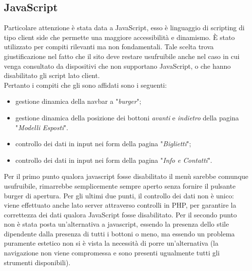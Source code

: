 \subsection{JavaScript}
Particolare attenzione è stata data a JavaScript, esso è linguaggio di scripting di tipo client side che permette una	maggiore accessibilità e dinamismo. È stato utilizzato per compiti rilevanti ma non fondamentali. Tale scelta trova giustificazione nel fatto che il sito deve restare usufruibile anche nel caso in cui venga consultato da dispositivi che non supportano JavaScript, o che hanno disabilitato gli script lato client.\\
Pertanto i compiti che gli sono affidati sono i seguenti:
\begin{itemize}
	\item gestione dinamica della navbar a "\textit{burger}";
	\item gestione dinamica della posizione dei bottoni \textit{avanti} e \textit{indietro} della pagina "\textit{Modelli Esposti}".
	\item controllo dei dati in input nei form della pagina "\textit{Biglietti}";
	\item controllo dei dati in input nei form della pagina "\textit{Info e Contatti}".
\end{itemize}
Per il primo punto qualora javascript fosse disabilitato il menù sarebbe comunque usufruibile, rimarrebbe semplicemente sempre aperto senza fornire il pulsante burger di apertura.
Per gli ultimi due punti, il controllo dei dati non è unico: viene effettuato anche lato server attraverso controlli in PHP, per garantire la correttezza dei dati qualora JavaScript fosse disabilitato.
Per il secondo punto non è stata posta un'alternativa a javascript, essendo la presenza dello stile dipendente dalla presenza di tutti i bottoni o meno, ma essendo un problema puramente estetico non si è vista la necessità di porre un'alternativa (la navigazione non viene compromessa e sono presenti ugualmente tutti gli strumenti disponibili).